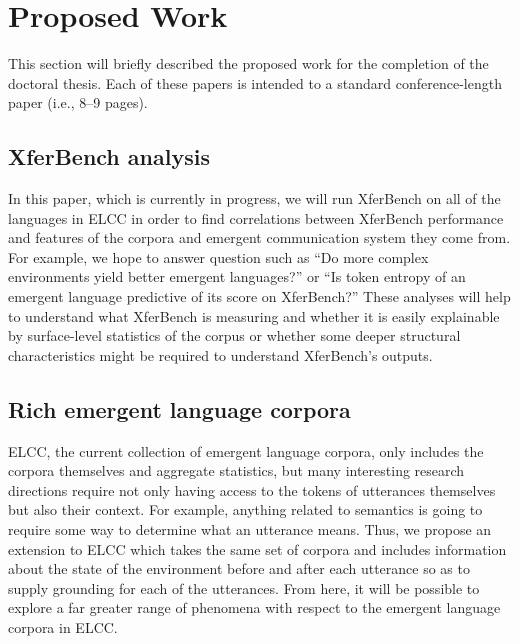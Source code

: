 \section{Proposed Work}
This section will briefly described the proposed work for the completion of the doctoral thesis.
Each of these papers is intended to a standard conference-length paper (i.e., 8--9 pages).

\subsection{XferBench analysis}
In this paper, which is currently in progress, we will run XferBench on all of the languages in ELCC in order to find correlations between XferBench performance and features of the corpora and emergent communication system they come from.
For example, we hope to answer question such as ``Do more complex environments yield better emergent languages?'' or ``Is token entropy of an emergent language predictive of its score on XferBench?''
These analyses will help to understand what XferBench is measuring and whether it is easily explainable by surface-level statistics of the corpus or whether some deeper structural characteristics might be required to understand XferBench's outputs.


\subsection{Rich emergent language corpora}
ELCC, the current collection of emergent language corpora, only includes the corpora themselves and aggregate statistics, but many interesting research directions require not only having access to the tokens of utterances themselves but also their context.
For example, anything related to semantics is going to require some way to determine what an utterance means.
Thus, we propose an extension to ELCC which takes the same set of corpora and includes information about the state of the environment before and after each utterance so as to supply grounding for each of the utterances.
From here, it will be possible to explore a far greater range of phenomena with respect to the emergent language corpora in ELCC\@.

